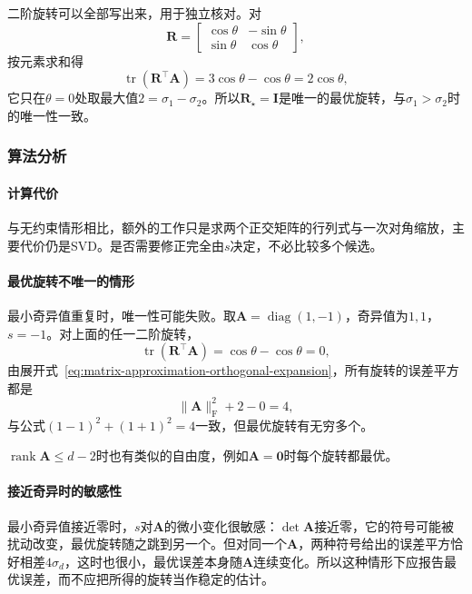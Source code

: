 二阶旋转可以全部写出来，用于独立核对。对
\[
 \bm R=\begin{bmatrix}\cos\theta&-\sin\theta\\\sin\theta&\cos\theta\end{bmatrix},
\]
按元素求和得
\[
 \operatorname{tr}(\bm R^\top\bm A)=3\cos\theta-\cos\theta=2\cos\theta ,
\]
它只在$\theta=0$处取最大值$2=\sigma_1-\sigma_2$。所以$\bm R_\star=\bm I$是唯一的最优旋转，与$\sigma_1>\sigma_2$时的唯一性一致。

\subsubsection{算法分析}

\paragraph{计算代价}
与无约束情形相比，额外的工作只是求两个正交矩阵的行列式与一次对角缩放，主要代价仍是SVD。是否需要修正完全由$s$决定，不必比较多个候选。

\paragraph{最优旋转不唯一的情形}
最小奇异值重复时，唯一性可能失败。取$\bm A=\operatorname{diag}(1,-1)$，奇异值为$1,1$，$s=-1$。对上面的任一二阶旋转，
\[
 \operatorname{tr}(\bm R^\top\bm A)=\cos\theta-\cos\theta=0 ,
\]
由展开式~\eqref{eq:matrix-approximation-orthogonal-expansion}，所有旋转的误差平方都是
\[
 \lVert\bm A\rVert_{\mathrm F}^2+2-0=4 ,
\]
与公式$(1-1)^2+(1+1)^2=4$一致，但最优旋转有无穷多个。

$\operatorname{rank}\bm A\leq d-2$时也有类似的自由度，例如$\bm A=\bm0$时每个旋转都最优。

\paragraph{接近奇异时的敏感性}
最小奇异值接近零时，$s$对$\bm A$的微小变化很敏感：$\det\bm A$接近零，它的符号可能被扰动改变，最优旋转随之跳到另一个。但对同一个$\bm A$，两种符号给出的误差平方恰好相差$4\sigma_d$，这时也很小，最优误差本身随$\bm A$连续变化。所以这种情形下应报告最优误差，而不应把所得的旋转当作稳定的估计。
